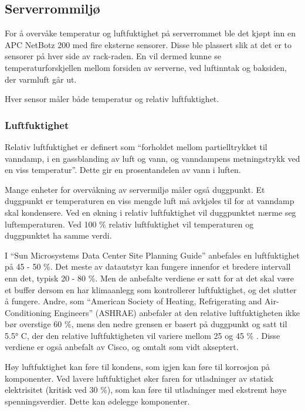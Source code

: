 \subsection{Serverrommiljø}
For å overvåke temperatur og luftfuktighet på serverrommet ble det kjøpt inn en APC NetBotz 200 med fire eksterne sensorer. Disse ble plassert slik at det er to sensorer på hver side av rack-raden. En vil dermed kunne se temperaturforskjellen mellom forsiden av serverne, ved luftinntak og baksiden, der varmluft går ut.

Hver sensor måler både temperatur og relativ luftfuktighet.

\subsubsection{Luftfuktighet}
Relativ luftfuktighet er definert som ``forholdet mellom partielltrykket til vanndamp, i en gassblanding av luft og vann, og vanndampens metningstrykk ved en viss temperatur''. Dette gir en prosentandelen av vann i luften\cite{wiki:luftfuktighet}. 

Mange enheter for overvåkning av servermiljø måler også duggpunkt. Et duggpunkt er temperaturen en viss mengde luft må avkjøles til for at vanndamp skal kondensere. Ved en økning i relativ luftfuktighet vil duggpunktet nærme seg luftemperaturen. Ved 100 \% relativ luftfuktighet vil temperaturen og duggpunktet ha samme verdi. 

I ``Sun Microsystems Data Center Site Planning Guide'' anbefales en luftfuktighet på 45 - 50 \%. Det meste av datautstyr kan fungere innenfor et bredere intervall enn det, typisk 20 - 80 \%. Men de anbefalte verdiene er satt for at det skal være et buffer dersom en har klimaanlegg som kontrollerer luftfuktighet, og det slutter å fungere\cite{planningserver}. Andre, som ``American Society of Heating, Refrigerating and Air-Conditioning Engineers'' (ASHRAE) anbefaler at den relative luftfuktigheten ikke bør overstige 60 \%, mens den nedre grensen er basert på duggpunkt og satt til 5.5° C, der den relative luftfuktigheten vil variere mellom 25 og 45 \% \cite{envguide}. Disse verdiene er også anbefalt av Cisco\cite{envguidecisco}, og omtalt som vidt akseptert. 

Høy luftfuktighet kan føre til kondens, som igjen kan føre til korrosjon på komponenter. Ved lavere luftfuktighet øker faren for utladninger av statisk elektrisitet (kritisk ved 30 \%), som kan føre til utladninger med ekstremt høye spenningsverdier. Dette kan ødelegge komponenter.

